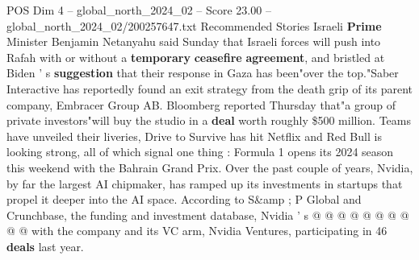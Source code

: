 \begin{textsample}{POS Dim 4 – global\_north\_2024\_02 – Score 23.00 – global\_north\_2024\_02/200257647.txt}
Recommended Stories Israeli \textbf{Prime} Minister Benjamin Netanyahu said Sunday that Israeli forces will push into Rafah with or without a \textbf{temporary} \textbf{ceasefire} \textbf{agreement}, and bristled at Biden ' s \textbf{suggestion} that their response in Gaza has been"over the top."Saber Interactive has reportedly found an exit strategy from the death grip of its parent company, Embracer Group AB.
Bloomberg reported Thursday that"a group of private investors"will buy the studio in a \textbf{deal} worth roughly \$500 million.
Teams have unveiled their liveries, Drive to Survive has hit Netflix and Red Bull is looking strong, all of which signal one thing : Formula 1 opens its 2024 season this weekend with the Bahrain Grand Prix.
Over the past couple of years, Nvidia, by far the largest AI chipmaker, has ramped up its investments in startups that propel it deeper into the AI space.
According to S\&amp ; P Global and Crunchbase, the funding and investment database, Nvidia ' s @ @ @ @ @ @ @ @ @ @ with the company and its VC arm, Nvidia Ventures, participating in 46 \textbf{deals} last year.

\end{textsample}
